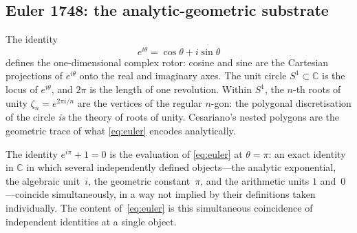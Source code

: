 \subsection{Euler 1748: the analytic-geometric substrate}
\label{ssec:euler-substrate}

The identity
\begin{equation}\label{eq:euler}
  e^{i\theta} = \cos\theta + i\sin\theta
\end{equation}
defines the one-dimensional complex rotor: cosine and sine are the
Cartesian projections of $e^{i\theta}$ onto the real and imaginary
axes.  The
unit circle $S^{1}\subset\mathbb{C}$ is the locus of $e^{i\theta}$, and
$2\pi$ is the length of one revolution.  Within $S^{1}$, the
$n$-th roots of unity $\zeta_{n} = e^{2\pi i/n}$ are the vertices of
the regular $n$-gon: the polygonal discretisation of the circle
\emph{is} the theory of roots of unity.  Cesariano's nested polygons
are the geometric trace of what \eqref{eq:euler} encodes analytically.

The identity $e^{i\pi}+1=0$ is the evaluation of \eqref{eq:euler} at
$\theta=\pi$: an exact identity in $\mathbb{C}$ in which several
independently defined objects---the analytic exponential, the
algebraic unit~$i$, the geometric constant~$\pi$, and the arithmetic
units $1$ and~$0$---coincide simultaneously, in a way not implied by
their definitions taken individually.  The content of~\eqref{eq:euler}
is this simultaneous coincidence of independent identities at a
single object.

